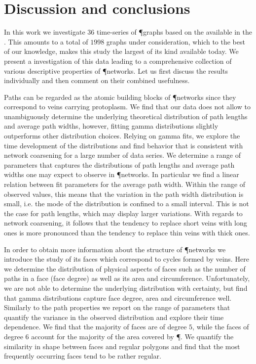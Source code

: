 	\section{Discussion and conclusions}

			In this work we investigate $36$ time-series of \P graphs based on the \data available in the \SMGR. This amounts to a total of $1998$ graphs under consideration, which to the best of our knowledge, makes this study the largest of its kind available today. We present a investigation of this data leading to a comprehensive collection of various descriptive properties of \P networks. Let us first discuss the results individually and then comment on their combined usefulness.

			Paths can be regarded as the atomic building blocks of \P networks since they correspond to veins carrying protoplasm. We find that our data does not allow to unambiguously determine the underlying theoretical distribution of path lengths and average path widths, however, fitting gamma distributions slightly outperforms other distribution choices. Relying on gamma fits, we explore the time development of the distributions and find behavior that is consistent with network coarsening for a large number of data series. We determine a range of parameters that captures the distributions of path lengths and average path widths one may expect to observe in \P networks. In particular we find a linear relation between fit parameters for the average path width. Within the range of observed values, this means that the variation in the path width distribution is small, i.e. the mode of the distribution is confined to a small interval. This is not the case for path lengths, which may display larger variations. With regards to network coarsening, it follows that the tendency to replace short veins with long ones is more pronounced than the tendency to replace thin veins with thick ones.

			In order to obtain more information about the structure of \P networks we introduce the study of its faces which correspond to cycles formed by veins.	Here we determine the distribution of physical aspects of faces such as the number of paths in a face (face degree) as well as its area and circumference. Unfortunately, we are not able to determine the underlying distribution with certainty, but find that gamma distributions capture face degree, area and circumference well. Similarly to the path properties we report on the range of parameters that quantify the variance in the observed distribution and explore their time dependence. We find that the majority of faces are of degree $5$, while the faces of degree $6$ account for the majority of the area covered by \P. We quantify the similarity in shape between faces and regular polygons and find that the most frequently occurring faces tend to be rather regular.

